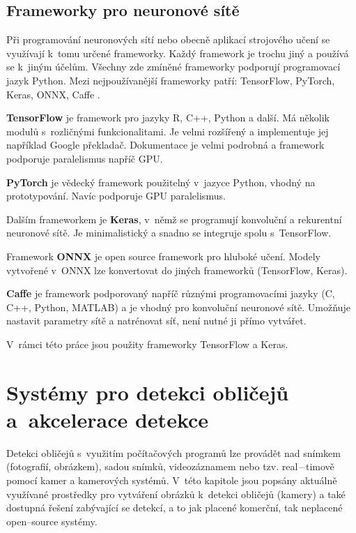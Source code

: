 \section{Frameworky pro neuronové sítě}
\label{sekce:frameworky_pro_ns}
Při programování neuronových sítí nebo obecně aplikací strojového učení se využívají k~tomu určené frameworky. Každý framework je trochu jiný a používá se k~jiným účelům. Všechny zde zmíněné frameworky podporují programovací jazyk Python. Mezi nejpoužívanější frameworky patří: TensorFlow, PyTorch, Keras, ONNX, Caffe \cite{nsFrameworks}.

\vspace{1em}
\textbf{TensorFlow} je framework pro jazyky R, C++, Python a další. Má několik modulů s~rozličnými funkcionalitami. Je velmi rozšířený a implementuje jej například Google překladač. Dokumentace je velmi podrobná a framework podporuje paralelismus napříč GPU.

\textbf{PyTorch} je vědecký framework použitelný v~jazyce Python, vhodný na prototypování. Navíc podporuje GPU paralelismus.

Dalším frameworkem je \textbf{Keras}, v~němž se programují konvoluční a rekurentní neuronové sítě. Je minimalistický a snadno se integruje spolu s~TensorFlow.

Framework \textbf{ONNX} je open source framework pro hluboké učení. Modely vytvořené v~ONNX lze konvertovat do jiných frameworků (TensorFlow, Keras).

\textbf{Caffe} je framework podporovaný napříč různými programovacími jazyky (C, C++, Python, MATLAB) a je vhodný pro konvoluční neuronové sítě. Umožňuje nastavit parametry sítě a natrénovat síť, není nutné ji přímo vytvářet.

V~rámci této práce jsou použity frameworky TensorFlow a Keras. 


\chapter{Systémy pro detekci obličejů a~akcelerace detekce}
\label{kapitola:kamery_a_systemy}
Detekci obličejů s~využitím počítačových programů lze provádět nad snímkem 
(fotografií, obrázkem), sadou snímků,
videozáznamem nebo tzv. real\,--\,timově pomocí kamer a kamerových systémů.
V~této kapitole jsou popsány aktuálně využívané prostředky pro vytváření 
obrázků k~detekci obličejů (kamery) a také dostupná řešení zabývající se 
detekcí, a to jak placené komerční, tak neplacené open--source systémy.

